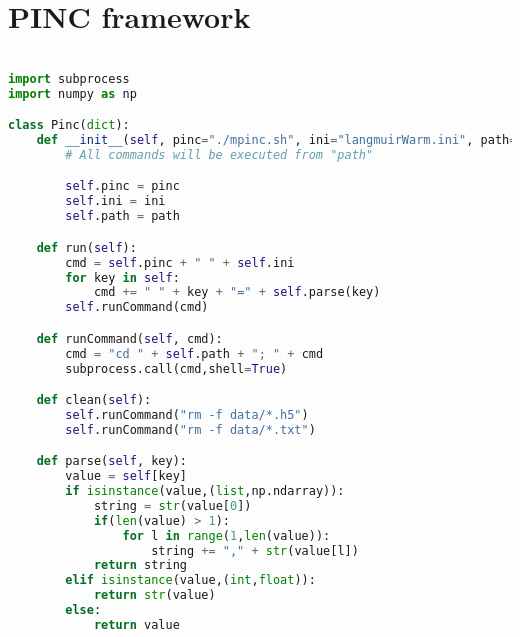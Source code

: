 \section{PINC framework}
\begin{lstlisting}[language=python, caption = Framework to more easily run PINC with various settings]

import subprocess
import numpy as np

class Pinc(dict):
	def __init__(self, pinc="./mpinc.sh", ini="langmuirWarm.ini", path="../.."):
		# All commands will be executed from "path"

		self.pinc = pinc
		self.ini = ini
		self.path = path

	def run(self):
		cmd = self.pinc + " " + self.ini
		for key in self:
			cmd += " " + key + "=" + self.parse(key)
		self.runCommand(cmd)

	def runCommand(self, cmd):
		cmd = "cd " + self.path + "; " + cmd
		subprocess.call(cmd,shell=True)

	def clean(self):
		self.runCommand("rm -f data/*.h5")
		self.runCommand("rm -f data/*.txt")

	def parse(self, key):
		value = self[key]
		if isinstance(value,(list,np.ndarray)):
			string = str(value[0])
			if(len(value) > 1):
				for l in range(1,len(value)):
					string += "," + str(value[l])
			return string
		elif isinstance(value,(int,float)):
			return str(value)
		else:
			return value
		\end{lstlisting}


